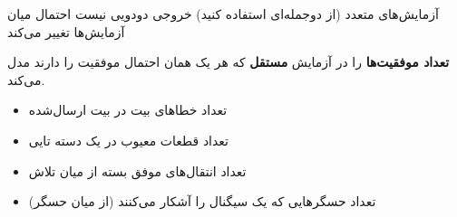 
\PSno{} آزمایش‌های متعدد (از دوجمله‌ای استفاده کنید)\PSbr{}\PSno{} خروجی دودویی نیست\PSbr{}\PSno{} احتمال میان آزمایش‌ها تغییر می‌کند



\begin{Shaded}
\begin{Highlighting}[]
 \OperatorTok{=} \OperatorTok{;}          
 \OperatorTok{=} \OperatorTok{;}
 \OperatorTok{=} \NormalTok{(}\OperatorTok{,} \OperatorTok{,} \OperatorTok{,} \NormalTok{)}\OperatorTok{;}  

\NormalTok{(}\OperatorTok{,} \NormalTok{(}\NormalTok{)}\OperatorTok{,} \NormalTok{)}\OperatorTok{;}
\NormalTok{(}\OperatorTok{,} \NormalTok{(}\NormalTok{)}\OperatorTok{,} \OperatorTok{*}\NormalTok{(}\OperatorTok{{-}}\NormalTok{))}\OperatorTok{;}
\end{Highlighting}
\end{Shaded}



\textbf{تعداد موفقیت‌ها} را در  آزمایش \textbf{مستقل} که هر یک همان احتمال موفقیت  را دارند مدل می‌کند.


\begin{itemize}
\tightlist
\item
  تعداد خطاهای بیت در  بیت ارسال‌شده
\item
  تعداد قطعات معیوب در یک دسته ‌تایی
\item
  تعداد انتقال‌های موفق بسته از میان  تلاش
\item
  تعداد حسگرهایی که یک سیگنال را آشکار می‌کنند (از میان  حسگر)
\end{itemize}

